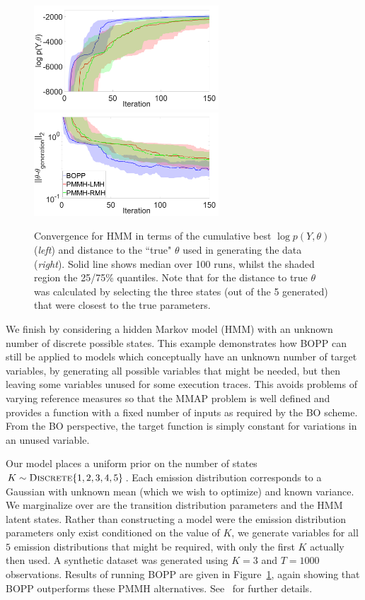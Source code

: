 
\begin{figure}[t]
	\centering
	\includegraphics[width=2.72in]{hmm/hmm_ML}
	~~~~~~
	\includegraphics[width=2.72in]{hmm/hmm_distance}
	\caption{Convergence for HMM in terms of the cumulative best $\log p\left(Y,\theta\right)$ (\emph{left}) and distance to the ``true" $\theta$ used in generating the data (\emph{right}). Solid line shows median over 100 runs, whilst the shaded region the 25/75\% quantiles.  Note that for the distance to true $\theta$ was calculated by selecting the three states (out of the 5 generated) that were closest to the true parameters.  \label{fig:hmm}}
\end{figure}

We finish by considering a hidden Markov model (HMM) with an unknown number of discrete possible states.  
This example demonstrates how BOPP can still be applied to models which conceptually have an 
unknown number of target variables, by generating all possible variables that might be needed, 
but then leaving some variables unused for some execution traces.  This avoids problems 
of varying reference measures so that the MMAP problem is well defined  and provides a 
function with a fixed number of inputs as required by the BO scheme.  From the BO 
perspective, the target function is simply constant for variations in an unused variable.

Our model places a uniform prior on the number of states $K \sim \textsc{Discrete}\{1,2,3,4,5\}$.
Each emission distribution corresponds to a Gaussian with unknown mean (which we wish to
optimize) and known variance.  
We marginalize over are the transition distribution parameters and the HMM latent states.  
Rather than constructing a model were the emission distribution
parameters only exist conditioned on the value of $K$, we generate variables for all $5$ emission
distributions that might be required, with only the first $K$ actually then used.  
A synthetic dataset was generated using $K=3$ and $T=1000$ observations.  Results of running BOPP are given
in Figure~\ref{fig:hmm}, again showing that BOPP outperforms these PMMH alternatives.  See~\cite{rainforth2017boppArxiv}
for further details.